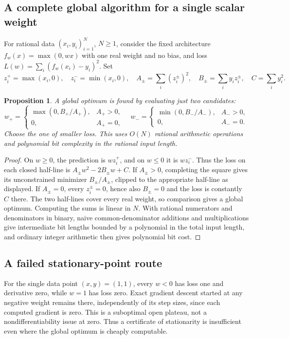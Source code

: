\documentclass[11pt]{article}
\newtheorem{proposition}{Proposition}
\begin{document}
\subsection{A complete global algorithm for a single scalar weight}
For rational data $(x_i,y_i)_{i=1}^N$, $N\ge1$, consider the fixed architecture $f_w(x)=\max(0,wx)$ with one real weight and no bias, and loss $L(w)=\sum_i(f_w(x_i)-y_i)^2$. Set
\[
 z_i^+=\max(x_i,0),\quad z_i^-=\min(x_i,0),\quad
 A_\pm=\sum_i(z_i^\pm)^2,\quad B_\pm=\sum_i y_i z_i^\pm,\quad C=\sum_i y_i^2.
\]
\begin{proposition}
A global optimum is found by evaluating just two candidates:
\[
 w_+=\begin{cases}\max(0,B_+/A_+),&A_+>0,\\0,&A_+=0,\end{cases}
 \quad
 w_-=\begin{cases}\min(0,B_-/A_-),&A_->0,\\0,&A_-=0.\end{cases}
\]
Choose the one of smaller loss. This uses $O(N)$ rational arithmetic operations and polynomial bit complexity in the rational input length.
\end{proposition}
\begin{proof}
On $w\ge0$, the prediction is $wz_i^+$, and on $w\le0$ it is $wz_i^-$. Thus the loss on each closed half-line is $A_\pm w^2-2B_\pm w+C$. If $A_\pm>0$, completing the square gives its unconstrained minimizer $B_\pm/A_\pm$, clipped to the appropriate half-line as displayed. If $A_\pm=0$, every $z_i^\pm=0$, hence also $B_\pm=0$ and the loss is constantly $C$ there. The two half-lines cover every real weight, so comparison gives a global optimum. Computing the sums is linear in $N$. With rational numerators and denominators in binary, naive common-denominator additions and multiplications give intermediate bit lengths bounded by a polynomial in the total input length, and ordinary integer arithmetic then gives polynomial bit cost.
\end{proof}
\subsection{A failed stationary-point route}
For the single data point $(x,y)=(1,1)$, every $w<0$ has loss one and derivative zero, while $w=1$ has loss zero. Exact gradient descent started at any negative weight remains there, independently of its step sizes, since each computed gradient is zero. This is a suboptimal open plateau, not a nondifferentiability issue at zero. Thus a certificate of stationarity is insufficient even where the global optimum is cheaply computable.
\end{document}

